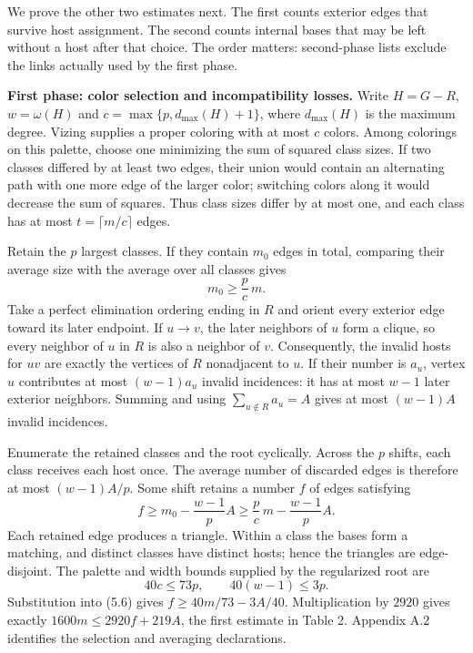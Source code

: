 \documentclass[english,11pt,a4paper]{article}
\begin{document}
We prove the other two estimates next. The first counts exterior edges that survive host assignment. The second counts internal bases that may be left without a host after that choice. The order matters: second-phase lists exclude the links actually used by the first phase.

\textbf{First phase: color selection and incompatibility losses.} Write \(H=G-R\), \(w=\omega(H)\) and \(c=\max\{p,d_{\max}(H)+1\}\), where \(d_{\max}(H)\) is the maximum degree. Vizing supplies a proper coloring with at most \(c\) colors. Among colorings on this palette, choose one minimizing the sum of squared class sizes. If two classes differed by at least two edges, their union would contain an alternating path with one more edge of the larger color; switching colors along it would decrease the sum of squares. Thus class sizes differ by at most one, and each class has at most \(t=\lceil m/c\rceil\) edges.

Retain the \(p\) largest classes. If they contain \(m_0\) edges in total, comparing their average size with the average over all classes gives \[
m_0\ge\frac pc\,m.
\tag{5.5}
\] Take a perfect elimination ordering ending in \(R\) and orient every exterior edge toward its later endpoint. If \(u\to v\), the later neighbors of \(u\) form a clique, so every neighbor of \(u\) in \(R\) is also a neighbor of \(v\). Consequently, the invalid hosts for \(uv\) are exactly the vertices of \(R\) nonadjacent to \(u\). If their number is \(a_u\), vertex \(u\) contributes at most \((w-1)a_u\) invalid incidences: it has at most \(w-1\) later exterior neighbors. Summing and using \(\sum_{u\notin R}a_u=A\) gives at most \((w-1)A\) invalid incidences.

Enumerate the retained classes and the root cyclically. Across the \(p\) shifts, each class receives each host once. The average number of discarded edges is therefore at most \((w-1)A/p\). Some shift retains a number \(f\) of edges satisfying \[
f\ge m_0-\frac{w-1}{p}A
\ge\frac pc\,m-\frac{w-1}{p}A.
\tag{5.6}
\] Each retained edge produces a triangle. Within a class the bases form a matching, and distinct classes have distinct hosts; hence the triangles are edge-disjoint. The palette and width bounds supplied by the regularized root are \[
40c\le73p,\qquad 40(w-1)\le3p.
\tag{5.7}
\] Substitution into (5.6) gives \(f\ge40m/73-3A/40\). Multiplication by \(2920\) gives exactly \(1600m\le2920f+219A\), the first estimate in Table 2. Appendix A.2 identifies the selection and averaging declarations.
\end{document}
